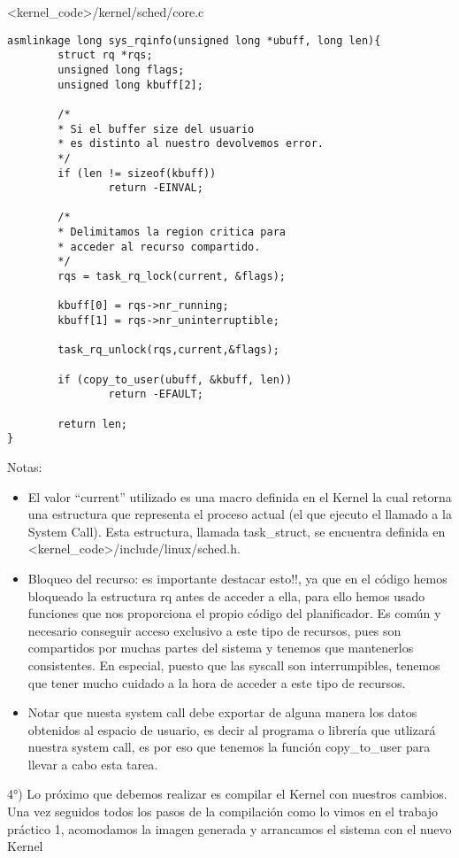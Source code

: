 <kernel\_code>/kernel/sched/core.c

\begin{verbatim}
asmlinkage long sys_rqinfo(unsigned long *ubuff, long len){
        struct rq *rqs;
        unsigned long flags;
        unsigned long kbuff[2];

        /*
        * Si el buffer size del usuario
        * es distinto al nuestro devolvemos error.
        */
        if (len != sizeof(kbuff))
                return -EINVAL;

        /*
        * Delimitamos la region critica para
        * acceder al recurso compartido.
        */
        rqs = task_rq_lock(current, &flags);

        kbuff[0] = rqs->nr_running;
        kbuff[1] = rqs->nr_uninterruptible;

        task_rq_unlock(rqs,current,&flags);

        if (copy_to_user(ubuff, &kbuff, len))
                return -EFAULT;

        return len;
}
\end{verbatim}


Notas:
\begin{itemize}  
\item El valor “current” utilizado es una macro definida en el Kernel la cual retorna una estructura que representa el proceso actual (el que ejecuto el llamado a la System Call). Esta estructura, llamada task\_struct, se encuentra definida en <kernel\_code>/include/linux/sched.h.
\item Bloqueo del recurso: es importante destacar esto!!, ya que en el código hemos bloqueado la estructura rq antes de acceder a ella, para ello hemos usado funciones que nos proporciona el propio código del planificador. Es común y necesario conseguir acceso exclusivo a este tipo de recursos, pues son compartidos por muchas partes del sistema y tenemos que mantenerlos consistentes. En especial, puesto que las syscall son interrumpibles, tenemos que tener mucho cuidado a la hora de acceder a este tipo de recursos.
\item Notar que nuesta system call debe exportar de alguna manera los datos obtenidos al espacio de usuario, es decir al programa o librería que utlizará nuestra system call, es por eso que tenemos la función copy\_to\_user para llevar a cabo esta tarea.
\end{itemize}  

4°) Lo próximo que debemos realizar es compilar el Kernel con nuestros cambios. Una vez seguidos todos los pasos de la compilación como lo vimos en el trabajo práctico 1, acomodamos la imagen generada y arrancamos el sistema con el nuevo Kernel

